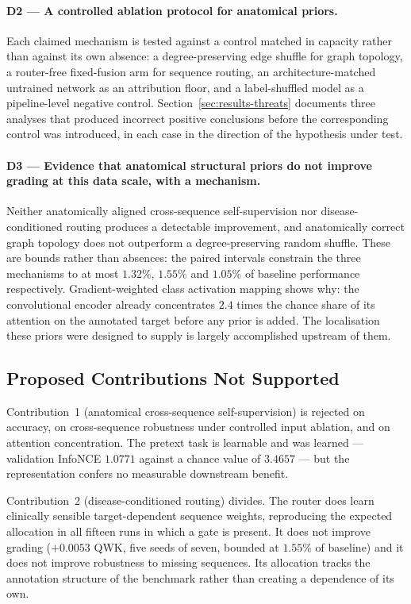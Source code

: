 \paragraph{D2 --- A controlled ablation protocol for anatomical priors.} Each
claimed mechanism is tested against a control matched in capacity rather than
against its own absence: a degree-preserving edge shuffle for graph topology, a
router-free fixed-fusion arm for sequence routing, an architecture-matched
untrained network as an attribution floor, and a label-shuffled model as a
pipeline-level negative control. Section~\ref{sec:results-threats} documents
three analyses that produced incorrect positive conclusions before the
corresponding control was introduced, in each case in the direction of the
hypothesis under test.

\paragraph{D3 --- Evidence that anatomical structural priors do not improve
grading at this data scale, with a mechanism.} Neither anatomically aligned
cross-sequence self-supervision nor disease-conditioned routing produces a
detectable improvement, and anatomically correct graph topology does not
outperform a degree-preserving random shuffle. These are bounds rather than
absences: the paired intervals constrain the three mechanisms to at most
$1.32\%$, $1.55\%$ and $1.05\%$ of baseline performance respectively. Gradient-weighted class activation
mapping shows why: the convolutional encoder already concentrates $2.4$ times the
chance share of its attention on the annotated target before any prior is added.
The localisation these priors were designed to supply is largely accomplished
upstream of them.

\subsection{Proposed Contributions Not Supported}
\label{sec:intro-contrib-negative}

Contribution~1 (anatomical cross-sequence self-supervision) is rejected on
accuracy, on cross-sequence robustness under controlled input ablation, and on
attention concentration. The pretext task is learnable and was learned ---
validation InfoNCE $1.0771$ against a chance value of $3.4657$ --- but the
representation confers no measurable downstream benefit.

Contribution~2 (disease-conditioned routing) divides. The router does learn
clinically sensible target-dependent sequence weights, reproducing the expected
allocation in all fifteen runs in which a gate is present. It does not improve
grading ($+0.0053$ QWK, five seeds of seven, bounded at $1.55\%$ of baseline)
and it does not improve robustness to missing sequences.
Its allocation tracks the annotation structure of the benchmark rather than
creating a dependence of its own.

